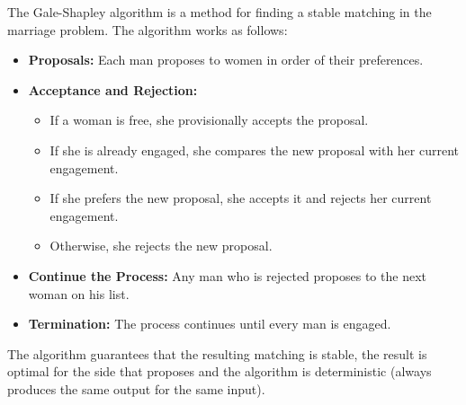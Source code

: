 \begin{definition}
    The Gale-Shapley algorithm is a method for finding a stable matching in the marriage problem. The algorithm works as follows:
    \begin{itemize}[itemsep=1pt,label=$\circ$]
        \item \textbf{Proposals:} Each man proposes to women in order of their preferences.
        \item \textbf{Acceptance and Rejection:}
        \begin{itemize}[itemsep=1pt,label=$\circ$]
            \item If a woman is free, she provisionally accepts the proposal.
            \item If she is already engaged, she compares the new proposal with her current engagement. 
            \item If she prefers the new proposal, she accepts it and rejects her current engagement. 
            \item Otherwise, she rejects the new proposal.
        \end{itemize}
        \item \textbf{Continue the Process:} Any man who is rejected proposes to the next woman on his list.
        \item \textbf{Termination:} The process continues until every man is engaged.
    \end{itemize}
    The algorithm guarantees that the resulting matching is stable, the result is optimal for the side that proposes and the algorithm is deterministic (always produces the same output for the same input).
\end{definition}
